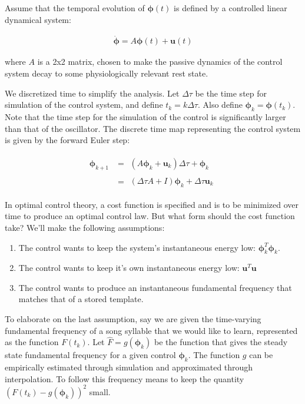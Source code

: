 \documentclass{article} %
\begin{document}
Assume that the temporal evolution of $\bm{\phi}(t)$ is defined by a controlled linear dynamical
system:

\begin{align*}
\dot{\bm{\phi}}=A\bm{\phi}(t) + \bm{u}(t)
\end{align*}

where $A$ is a 2x2 matrix, chosen to make the passive dynamics of the control system decay
to some physiologically relevant rest state.

We discretized time to simplify the analysis. Let $\Delta\tau$ be the time step for
simulation of the control system, and define $t_k = k\Delta\tau$. Also define
$\bm{\phi}_k = \bm{\phi}(t_k)$. Note that the time step for the simulation of the
control is significantly larger than that of the oscillator. The discrete time map
representing the control system is given by the forward Euler step:

\begin{align*}
\bm{\phi}_{k+1} &= \begin{aligned}\left( A\bm{\phi}_k + \bm{u}_k \right) \Delta\tau + \bm{\phi}_{k}\end{aligned} \\
                &=\begin{aligned}\left( \Delta\tau A + I \right) \bm{\phi}_k + \Delta\tau \bm{u}_k\end{aligned}
\end{align*}

In optimal control theory, a cost function is specified and is to be minimized over time to
produce an optimal control law. But what form should the cost function take? We'll make
the following assumptions:

\begin{enumerate}

\item The control wants to keep the system's instantaneous energy low: $\bm{\phi}_k^T \bm{\phi}_k$.
\item The control wants to keep it's own instantaneous energy low: $\bm{u}^T \bm{u}$ 
\item The control wants to produce an instantaneous fundamental frequency that matches that of a stored template.

\end{enumerate}

To elaborate on the last assumption, say we are given the time-varying fundamental frequency
of a song syllable that we would like to learn, represented as the function $F(t_k)$. Let
$\hat{F} = g(\bm{\phi}_k)$ be the function that gives the steady state fundamental
frequency for a given control $\bm{\phi}_k$. The function $g$ can be empirically
estimated through simulation and approximated through interpolation. To follow this
frequency means to keep the quantity $\left( F(t_k) - g(\bm{\phi}_k) \right) ^2$ small.
\end{document}
